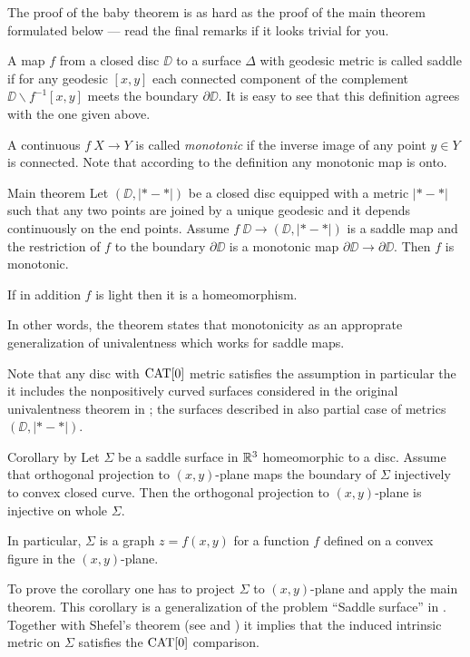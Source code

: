 \documentclass{article}
\begin{document}
The proof of the baby theorem is as hard as the proof of the main theorem formulated below --- read the final remarks if it looks trivial for you.

A map $f$ from a closed disc $\DD$ to a surface $\Delta$ with geodesic metric is called saddle if for any geodesic $[x,y]$ each connected component of the complement $\DD\backslash f^{-1}[x,y]$ meets the boundary $\partial\DD$.
It is easy to see that this definition agrees with the one given above.

A continuous  $f\:X\to Y$ is called \emph{monotonic} if the inverse image of any point $y\in Y$ is connected.
Note that according to the definition any monotonic map is onto.

\begin{thm}{Main theorem}
Let $(\DD,|{*}-{*}|)$ be a closed disc equipped with a metric $|{*}-{*}|$ such that any two points are joined by a unique geodesic and it depends continuously on the end points.
Assume $f\:\DD\to (\DD,|{*}-{*}|)$ is a saddle map and the restriction of $f$ to the boundary $\partial\DD$ is a monotonic map $\partial\DD\to  \partial\DD$.
Then $f$ is monotonic. 

If in addition $f$ is light then it is a homeomorphism.
\end{thm}

In other words, the theorem states that monotonicity as an approprate generalization of univalentness which works for saddle maps.

Note that any disc with $\mathop{\rm CAT}\nolimits[0]$ metric satisfies the assumption in particular the it includes the nonpositively curved surfaces considered in the original univalentness theorem in \cite{schoen-yau};
the surfaces described in \cite{jost} also partial case of metrics $(\DD,|{*}-{*}|)$.

\begin{thm}{Corollary}
by Let $\Sigma$ be a saddle surface in $\mathbb{R}^3$ homeomorphic to a disc.
Assume that orthogonal projection to $(x,y)$-plane
maps the boundary of $\Sigma$
injectively to convex closed curve.
Then the orthogonal projection to $(x,y)$-plane is injective on whole $\Sigma$.

In particular, $\Sigma$ is a graph $z=f(x,y)$ for a function $f$ defined on a convex figure in the $(x,y)$-plane.
\end{thm}

To prove the corollary one has to project $\Sigma$ to $(x,y)$-plane and apply the main theorem.
This corollary is a generalization of the problem ``Saddle surface'' in \cite{petrunin-orthodox}.
Together with Shefel's theorem (see \cite{shefel-3D} and \cite[4.5.5]{akp}) it implies that the induced intrinsic metric on $\Sigma$ satisfies the $\mathop{\rm CAT}\nolimits[0]$ comparison. 
\end{document}
